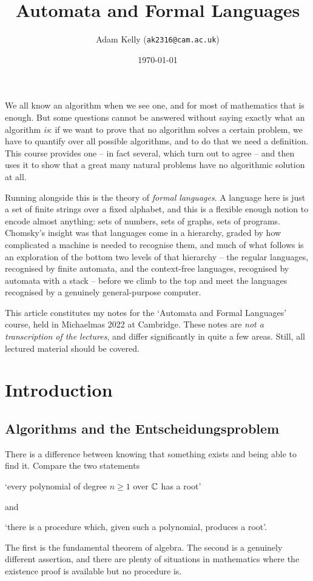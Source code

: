 \documentclass[a4paper]{scrartcl}
\title{Automata and Formal Languages}
\author{Adam Kelly (\texttt{ak2316@cam.ac.uk})}
\date{\today}
\begin{document}
\maketitle

We all know an algorithm when we see one, and for most of mathematics that is enough. But some questions cannot be answered without saying exactly what an algorithm \emph{is}: if we want to prove that no algorithm solves a certain problem, we have to quantify over all possible algorithms, and to do that we need a definition. This course provides one -- in fact several, which turn out to agree -- and then uses it to show that a great many natural problems have no algorithmic solution at all.

Running alongside this is the theory of \emph{formal languages}. A language here is just a set of finite strings over a fixed alphabet, and this is a flexible enough notion to encode almost anything: sets of numbers, sets of graphs, sets of programs. Chomsky's insight was that languages come in a hierarchy, graded by how complicated a machine is needed to recognise them, and much of what follows is an exploration of the bottom two levels of that hierarchy -- the regular languages, recognised by finite automata, and the context-free languages, recognised by automata with a stack -- before we climb to the top and meet the languages recognised by a genuinely general-purpose computer.

This article constitutes my notes for the `Automata and Formal Languages' course, held in Michaelmas 2022 at Cambridge. These notes are \emph{not a transcription of the lectures}, and differ significantly in quite a few areas. Still, all lectured material should be covered.

\tableofcontents

\section{Introduction}

\subsection{Algorithms and the Entscheidungsproblem}

There is a difference between knowing that something exists and being able to find it. Compare the two statements
\begin{center}
`every polynomial of degree $n \geq 1$ over $\mathbb{C}$ has a root'
\end{center}
and
\begin{center}
`there is a procedure which, given such a polynomial, produces a root'.
\end{center}
The first is the fundamental theorem of algebra. The second is a genuinely different assertion, and there are plenty of situations in mathematics where the existence proof is available but no procedure is.
\end{document}
